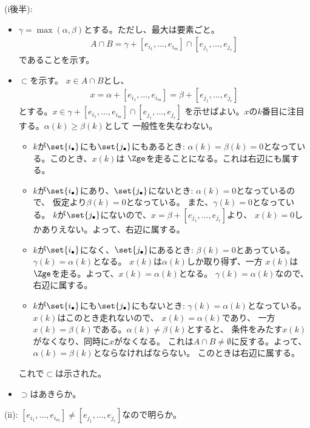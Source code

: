 \begin{myproof}
  (i後半):
  \begin{itemize}
    \item $\gamma = \max(\alpha,\beta)$とする。ただし、最大は要素ごと。
    \begin{align}
      A\cap B = \gamma + [e_{i_1},\dots,e_{i_m}]\cap [e_{j_1},\dots,e_{j_r}]
    \end{align}
    であることを示す。
    \item
    $\subset$を示す。
    $x\in A\cap B$とし、
    \begin{align}
      x=\alpha + [e_{i_1},\dots,e_{i_m}] = \beta + [e_{j_1},\dots,e_{j_r}]
    \end{align}
    とする。$x\in \gamma + [e_{i_1},\dots,e_{i_m}]\cap [e_{j_1},\dots,e_{j_r}]$
    を示せばよい。$x$の$k$番目に注目する。$\alpha(k) \ge \beta(k)$として
    一般性を失なわない。
    \begin{itemize}
      \item $k$が$\set{i_\bullet}$にも$\set{j_\bullet}$にもあるとき:
      $\alpha(k)=\beta(k)=0$となっている。このとき、$x(k)$は
      $\Zge$を走ることになる。これは右辺にも属する。
      \item $k$が$\set{i_\bullet}$にあり、$\set{j_\bullet}$にないとき:
      $\alpha(k)=0$となっているので、
      仮定より$\beta(k) = 0$となっている。
      また、$\gamma(k) = 0$となっている。
      $k$が$\set{j_\bullet}$にないので、$x=\beta+[e_{j_1},\dots,e_{j_r}]$より、
      $x(k)=0$しかありえない。よって、右辺に属する。
      \item $k$が$\set{i_\bullet}$になく、$\set{j_\bullet}$にあるとき:
      $\beta(k) = 0$とあっている。$\gamma(k) = \alpha(k)$となる。
      $x(k)$は$\alpha(k)$しか取り得ず、一方
      $x(k)$は$\Zge$を走る。よって、$x(k) = \alpha(k)$となる。
      $\gamma(k) = \alpha(k)$なので、右辺に属する。
      \item $k$が$\set{i_\bullet}$にも$\set{j_\bullet}$にもないとき:
      $\gamma(k) = \alpha(k)$となっている。$x(k)$はこのとき走れないので、
      $x(k) = \alpha(k)$であり、
      一方$x(k)=\beta(k)$である。$\alpha(k) \neq \beta(k)$とすると、
      条件をみたす$x(k)$がなくなり、同時に$x$がなくなる。
      これは$A\cap B\neq \emptyset$に反する。よって、
      $\alpha(k) = \beta(k)$とならなければならない。
      このときは右辺に属する。
    \end{itemize}
    これで$\subset$は示された。
    \item $\supset$はあきらか。
  \end{itemize}

(ii):
$[e_{i_1},\dots,e_{i_m}] \neq [e_{j_1},\dots,e_{j_r}]$なので明らか。
\end{myproof}

